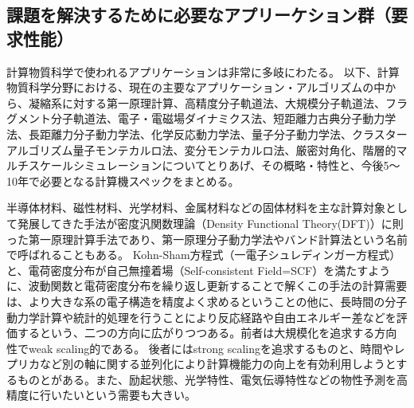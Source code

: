 \subsection{課題を解決するために必要なアプリーケション群（要求性能）}
\label{sec:4-2_要求性能}
計算物質科学で使われるアプリケーションは非常に多岐にわたる。
以下、計算物質科学分野における、現在の主要なアプリケーション・アルゴリズムの中から、凝縮系に対する第一原理計算、高精度分子軌道法、大規模分子軌道法、フラグメント分子軌道法、電子・電磁場ダイナミクス法、短距離力古典分子動力学法、長距離力分子動力学法、化学反応動力学法、量子分子動力学法、クラスターアルゴリズム量子モンテカルロ法、変分モンテカルロ法、厳密対角化、階層的マルチスケールシミュレーションについてとりあげ、その概略・特性と、今後5～10年で必要となる計算機スペックをまとめる。

\label{sec:4-2_要求性能_第一原理}
半導体材料、磁性材料、光学材料、金属材料などの固体材料を主な計算対象として発展してきた手法が密度汎関数理論（Density Functional Theory(DFT)）に則った第一原理計算手法であり、第一原理分子動力学法やバンド計算法という名前で呼ばれることもある。
Kohn-Sham方程式（一電子シュレディンガー方程式）と、電荷密度分布が自己無撞着場（Self-consistent Field=SCF）を満たすように、波動関数と電荷密度分布を繰り返し更新することで解くこの手法の計算需要は、より大きな系の電子構造を精度よく求めるということの他に、長時間の分子動力学計算や統計的処理を行うことにより反応経路や自由エネルギー差などを評価するという、二つの方向に広がりつつある。前者は大規模化を追求する方向性でweak scaling的である。
後者にはstrong scalingを追求するものと、時間やレプリカなど別の軸に関する並列化により計算機能力の向上を有効利用しようとするものとがある。また、励起状態、光学特性、電気伝導特性などの物性予測を高精度に行いたいという需要も大きい。

